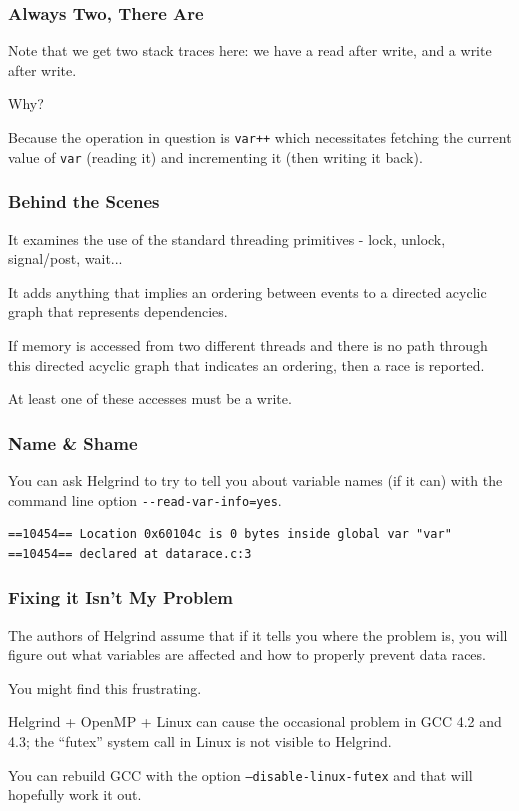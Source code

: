\begin{frame}
\frametitle{Always Two, There Are}


Note that we get two stack traces here: we have a read after write, and a write after write. 

Why? 

Because the operation in question is \texttt{var++} which necessitates fetching the current value of \texttt{var} (reading it) and incrementing it (then writing it back).

\end{frame}

\begin{frame}
\frametitle{Behind the Scenes}

It examines the use of the standard threading primitives - lock, unlock, signal/post, wait... 

It adds anything that implies an ordering between events to a directed acyclic graph that represents dependencies. 

If memory is accessed from two different threads and there is no path through this directed acyclic graph that indicates an ordering, then a race is reported. 

At least one of these accesses must be a write.

\end{frame}

\begin{frame}[fragile]
\frametitle{Name \& Shame}

You can ask Helgrind to try to tell you about variable names (if it can) with the command line option \verb+--read-var-info=yes+.

\begin{verbatim}
==10454== Location 0x60104c is 0 bytes inside global var "var"
==10454== declared at datarace.c:3
\end{verbatim}

\end{frame}

\begin{frame}
\frametitle{Fixing it Isn't My Problem}


The authors of Helgrind assume that if it tells you where the problem is, you will figure out what variables are affected and how to properly prevent data races. 

You might find this frustrating. 


Helgrind + OpenMP + Linux can cause the occasional problem in GCC 4.2 and 4.3; the ``futex'' system call in Linux is not visible to Helgrind. 

You can rebuild GCC with the option \texttt{--disable-linux-futex} and that will hopefully work it out.


\end{frame}


